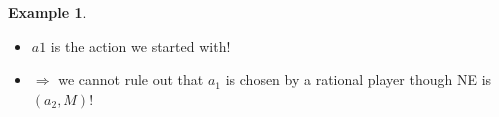 \documentclass[slidestop,serif,compress]{beamer}    %
\newcommand{\Ra}{\Rightarrow}
\theoremstyle{plain}
\theoremstyle{definition}
\newtheorem{ex}{Example}
\begin{document}
{\begin{ex}
\begin{itemize}
\begin{itemize}
    \begin{itemize}
    \item $R$ is b.r. if P2 thinks that a3 will be played
      \item \hspace*{1cm} a3  is a best response to $L$
        \item  \hspace*{2cm}$L$ is a best response to a1
    \end{itemize}
  \end{itemize}
\item $a1$ is the action we started with!
\item $\Ra$ we cannot rule out that $a_1$ is chosen by a rational player though NE is $(a_2,M)$!
\end{itemize}
\end{ex}

% 

}
\end{document}
